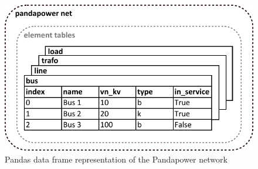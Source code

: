 \begin{figure}[H]
\centering
    \includegraphics[width=.6\linewidth]{images/Background/Pandapower/Pandapower_net.pdf}
\caption{Pandas data frame representation of the Pandapower network}
\end{figure}




